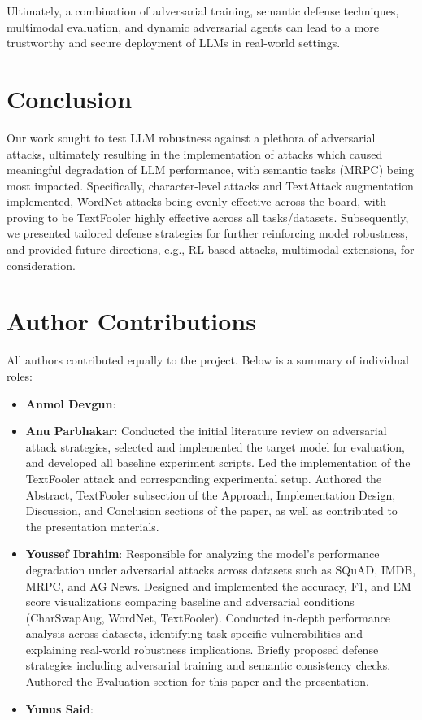 \documentclass[conference]{IEEEtran}
\begin{document}
\bigskip
Ultimately, a combination of adversarial training, semantic defense techniques, multimodal evaluation, and dynamic adversarial agents can lead to a more trustworthy and secure deployment of LLMs in real-world settings.

\section{Conclusion}

Our work sought to test LLM robustness against a plethora of adversarial attacks, ultimately resulting in the implementation of attacks which caused meaningful degradation of LLM performance, with semantic tasks (MRPC) being most impacted. Specifically, character-level attacks and TextAttack augmentation implemented, WordNet attacks being evenly effective across the board, with proving to be TextFooler highly effective across all tasks/datasets. Subsequently, we presented tailored defense strategies for further reinforcing model robustness, and provided future directions, e.g., RL-based attacks, multimodal extensions, for consideration.


\section*{Author Contributions}

All authors contributed equally to the project. Below is a summary of individual roles:

\begin{itemize}
    \item \textbf{Anmol Devgun}: 
    \item \textbf{Anu Parbhakar}: Conducted the initial literature review on adversarial attack strategies, selected and implemented the target model for evaluation, and developed all baseline experiment scripts. Led the implementation of the TextFooler attack and corresponding experimental setup. Authored the Abstract, TextFooler subsection of the Approach, Implementation Design, Discussion, and Conclusion sections of the paper, as well as contributed to the presentation materials.
 
    \item \textbf{Youssef Ibrahim}: Responsible for analyzing the model’s performance degradation under adversarial attacks across datasets such as SQuAD, IMDB, MRPC, and AG News. Designed and implemented the accuracy, F1, and EM score visualizations comparing baseline and adversarial conditions (CharSwapAug, WordNet, TextFooler). Conducted in-depth performance analysis across datasets, identifying task-specific vulnerabilities and explaining real-world robustness implications. Briefly proposed defense strategies including adversarial training and semantic consistency checks. Authored the Evaluation section for this paper and the presentation.

    \item \textbf{Yunus Said}: 
\end{itemize}




\end{document}
